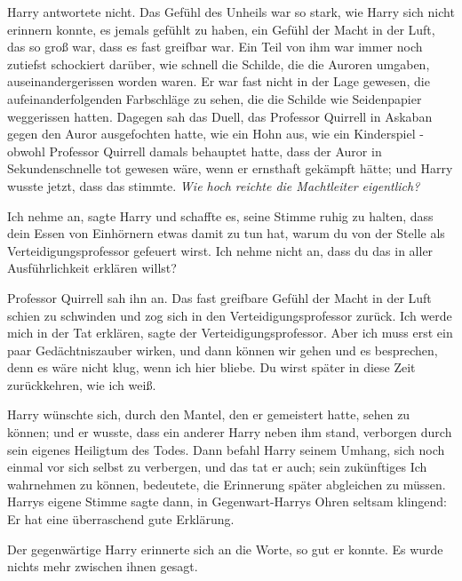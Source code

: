 Harry antwortete nicht. Das Gefühl des Unheils war so stark, wie Harry sich
nicht erinnern konnte, es jemals gefühlt zu haben, ein Gefühl der Macht
in der Luft, das so groß war, dass es fast greifbar war. Ein Teil von ihm
war immer noch zutiefst schockiert darüber, wie schnell die Schilde, die
die Auroren umgaben, auseinandergerissen worden waren. Er war fast nicht
in der Lage gewesen, die aufeinanderfolgenden Farbschläge zu sehen, die
die Schilde wie Seidenpapier weggerissen hatten. Dagegen sah das Duell,
das Professor Quirrell in Askaban gegen den Auror ausgefochten hatte, wie
ein Hohn aus, wie ein Kinderspiel - obwohl Professor Quirrell damals
behauptet hatte, dass der Auror in Sekundenschnelle tot gewesen wäre,
wenn er ernsthaft gekämpft hätte; und Harry wusste jetzt, dass das
stimmte.
\emph{Wie hoch reichte die Machtleiter eigentlich?}

\glqq{}Ich nehme an\grqq{}, sagte Harry und schaffte es, seine Stimme ruhig zu
halten, \glqq{}dass dein Essen von Einhörnern etwas damit zu tun hat,
warum du von der Stelle als Verteidigungsprofessor gefeuert wirst. Ich
nehme nicht an, dass du das in aller Ausführlichkeit erklären
willst?\grqq{}

Professor Quirrell sah ihn an. Das fast greifbare Gefühl der Macht in der Luft
schien zu schwinden und zog sich in den Verteidigungsprofessor zurück.
\glqq{}Ich werde mich in der Tat erklären\grqq{}, sagte der
Verteidigungsprofessor. \glqq{}Aber ich muss erst ein paar
Gedächtniszauber wirken, und dann können wir gehen und es besprechen,
denn es wäre nicht klug, wenn ich hier bliebe. Du wirst später in diese
Zeit zurückkehren, wie ich weiß.\grqq{}

Harry wünschte sich, durch den Mantel, den er gemeistert hatte, sehen zu können;
und er wusste, dass ein anderer Harry neben ihm stand, verborgen durch
sein eigenes Heiligtum des Todes. Dann befahl Harry seinem Umhang, sich
noch einmal vor sich selbst zu verbergen, und das tat er auch; sein
zukünftiges Ich wahrnehmen zu können, bedeutete, die Erinnerung später
abgleichen zu müssen. Harrys eigene Stimme sagte dann, in
Gegenwart-Harrys Ohren seltsam klingend: \glqq{}Er hat eine überraschend
gute Erklärung.\grqq{}

Der gegenwärtige Harry erinnerte sich an die Worte, so gut er konnte. Es wurde
nichts mehr zwischen ihnen gesagt.

